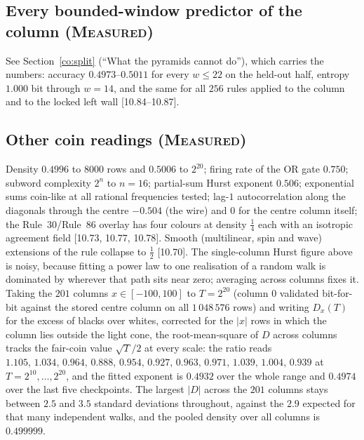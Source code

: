 \documentclass[11pt]{article}
\theoremstyle{definition}
\theoremstyle{remark}
\newcommand{\MEASURED}{\textsc{Measured}}
\begin{document}
\subsection*{Every bounded-window predictor of the column (\MEASURED)}
See Section~\ref{co:split} (``What the pyramids cannot do''), which carries the numbers: accuracy $0.4973$--$0.5011$ for every $w\le22$ on the held-out half, entropy $1.000$ bit through $w=14$, and the same for all $256$ rules applied to the column and to the locked left wall [10.84--10.87].

\subsection*{Other coin readings (\MEASURED)}
Density $0.4996$ to $8000$ rows and $0.5006$ to $2^{20}$; firing rate of the OR gate $0.750$; subword complexity $2^n$ to $n=16$; partial-sum Hurst exponent $0.506$; exponential sums coin-like at all rational frequencies tested; lag-$1$ autocorrelation along the diagonals through the centre $-0.504$ (the wire) and $0$ for the centre column itself; the Rule~30/Rule~86 overlay has four colours at density $\tfrac14$ each with an isotropic agreement field [10.73, 10.77, 10.78]. Smooth (multilinear, spin and wave) extensions of the rule collapse to $\tfrac12$ [10.70].
The single-column Hurst figure above is noisy, because fitting a power law to one realisation of a
random walk is dominated by wherever that path sits near zero; averaging across columns fixes it. Taking
the $201$ columns $x\in[-100,100]$ to $T=2^{20}$ (column $0$ validated bit-for-bit against the stored
centre column on all $1\,048\,576$ rows) and writing $D_x(T)$ for the excess of blacks over whites,
corrected for the $|x|$ rows in which the column lies outside the light cone, the root-mean-square of
$D$ across columns tracks the fair-coin value $\sqrt T/2$ at every scale: the ratio reads
$1.105,\,1.034,\,0.964,\,0.888,\,0.954,\,0.927,\,0.963,\,0.971,\,1.039,\,1.004,\,0.939$ at
$T=2^{10},\dots,2^{20}$, and the fitted exponent is $0.4932$ over the whole range and $0.4974$ over the
last five checkpoints. The largest $|D|$ across the $201$ columns stays between $2.5$ and $3.5$ standard
deviations throughout, against the $2.9$ expected for that many independent walks, and the pooled density
over all columns is $0.499999$.
\end{document}
